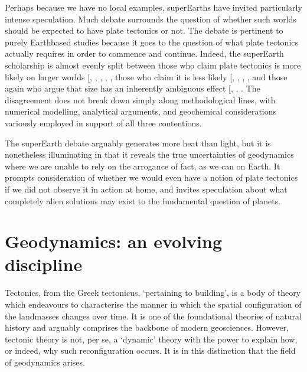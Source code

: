 \documentclass[letterpaper,10pt,english]{jupyterBook}
\begin{document}
\sphinxAtStartPar
Perhaps because we have no local examples, super\sphinxhyphen{}Earths have invited particularly intense speculation. Much debate surrounds the question of whether such worlds should be expected to have plate tectonics or not. The debate is pertinent to purely Earth\sphinxhyphen{}based studies because it goes to the question of what plate tectonics actually requires in order to commence and continue. Indeed, the super\sphinxhyphen{}Earth scholarship is almost evenly split between those who claim plate tectonics is more likely on larger worlds {[}, , , , \sphinxcite{references:id744}{]}, those who claim it is less likely {[}, , , \sphinxcite{references:id747}{]}, and those again who argue that size has an inherently ambiguous effect {[}, , \sphinxcite{references:id434}{]}. The disagreement does not break down simply along methodological lines, with numerical modelling, analytical arguments, and geochemical considerations variously employed in support of all three contentions.

\sphinxAtStartPar
The super\sphinxhyphen{}Earth debate arguably generates more heat than light, but it is nonetheless illuminating in that it reveals the true uncertainties of geodynamics where we are unable to rely on the arrogance of fact, as we can on Earth. It prompts consideration of whether we would even have a notion of plate tectonics if we did not observe it in action at home, and invites speculation about what completely alien solutions may exist to the fundamental question of planets.


\section{Geodynamics: an evolving discipline}
\label{\detokenize{content/chapter_01_background/main:geodynamics-an-evolving-discipline}}
\sphinxAtStartPar
Tectonics, from the Greek tectonicus, ‘pertaining to building’, is a body of theory which endeavours to characterise the manner in which the spatial configuration of the landmasses changes over time. It is one of the foundational theories of natural history and arguably comprises the backbone of modern geosciences. However, tectonic theory is not, per se, a ‘dynamic’ theory with the power to explain how, or indeed, why such reconfiguration occurs. It is in this distinction that the field of geodynamics arises.
\end{document}
